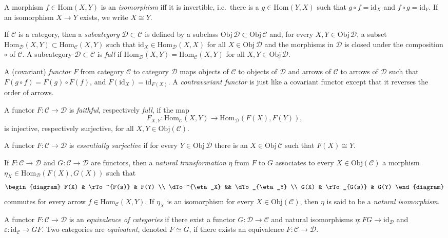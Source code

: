 \documentclass[12pt]{article}
\theoremstyle{definition}
\theoremstyle{definition}
\theoremstyle{remark}
\newcommand{\Obj}{\mathrm{Obj}}
\newcommand{\ve}{\varepsilon}
\def\2#1{{\mathcal #1}}
\newcommand{\Hom}{\mathrm{Hom}}
\newcommand{\rarr}{\rightarrow}
\def\id{\mathrm{id}}
\begin{document}
\bdefin {} A morphism $f\in \Hom (X,Y)$ is an
\emph{isomorphism} iff it is invertible, i.e.\ there is a $g\in \Hom
(Y,X)$ such that $g\circ f=\id_{X}$ and $f\circ g=\id_Y$. If an
isomorphism $X\rarr Y$ exists, we write $X\cong Y$.  \edefin

\bdefin {} If $\2C$ is a category, then a
\emph{subcategory} $\2D\subset\2C$ is defined by a subclass
$\Obj\,\2D\subset\Obj\,\2C$ and, for every $X,Y\in\Obj\,\2D$, a subset
$\Hom_\2D(X,Y)\subset\Hom_\2C(X,Y)$ such that $\id_X\in\Hom_\2D(X,X)$
for all $X\in\Obj\,\2D$ and the morphisms in $\2D$ is closed under the
composition $\circ$ of $\2C$. A subcategory $\2D\subset\2C$ is
\emph{full} if $\Hom_\2D(X,Y)=\Hom_\2C(X,Y)$ for all
$X,Y\in\Obj\,\2D$.  \edefin

\bdefin {}
A (covariant) \emph{functor} $F$ from category $\2C$ to category $\2D$
  maps objects of $\2C$ to objects of $\2D$ and arrows of $\2C$ to arrows of $\2D$
  such that $F(g\circ f)=F(g)\circ F(f)$, and $F(\id _X)=\id _{F(X)}$.  A
  \emph{contravariant functor} is just like a covariant functor except that it
  reverses the order of arrows. \edefin

  \bdefin {}  A functor
  $F:\2C\to \2D$ is \emph{faithful}, respectively \emph{full}, if the
  map
\[ F_{X,Y}:\Hom _{\2C}(X,Y)\to \Hom _{\2D}(F(X),F(Y)), \]
is injective, respectively surjective, for all $X,Y\in \Obj (\2C)$.  
\edefin

\bdefin {}
A functor $F:\2C\to \2D$ is \emph{essentially surjective} if for every $Y\in\Obj\,\2D$ there
is an $X\in\Obj\,\2C$ such that $F(X)\cong Y$.
\edefin

\bdefin {} \label{nat-trans}
If $F:\2C\to \2D$ and $G:\2C\to \2D$ are functors, then a \emph{natural
    transformation} $\eta$ from $F$ to $G$ associates to every $X\in\Obj (\2C )$ a
  morphism $\eta _X \in \Hom _{\2D }(F(X),G(X))$ such that 
\[ \begin{diagram} F(X) & \rTo^{F(s)} & F(Y) \\
   \dTo^{\eta_X} && \dTo_{\eta_Y} \\
   G(X) & \rTo_{G(s)} & G(Y) \end{diagram} \]
commutes for every arrow $f\in \Hom_{\2C }(X,Y)$.  If $\eta _X$ is an isomorphism
for every $X\in \Obj (\2C )$, then $\eta$ is said
  to be a \emph{natural isomorphism}. 
\edefin

\bdefin {} 
A functor $F:\2C\to \2D$ is an \emph{equivalence of categories} if there exist a functor
$G:\2D\to \2C$ and natural isomorphisms $\eta:FG\to \id _{\2D}$ and $\ve :\id _{\2C}\to GF$. Two
categories are \emph{equivalent}, denoted $F\simeq G$, if there exists an equivalence
$F:\2C\rarr\2D$. 
\edefin
\end{document}

